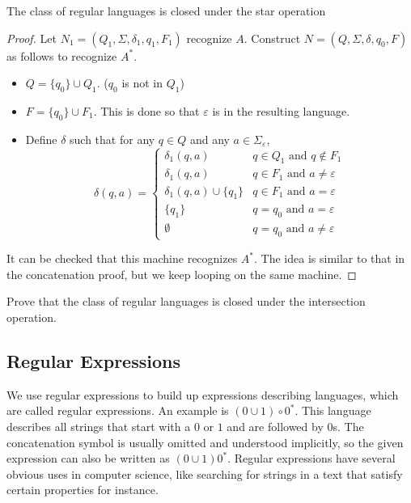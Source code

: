 \begin{theorem}
The class of regular languages is closed under the star operation
\end{theorem}
\begin{proof}
Let $N_1=(Q_1,\Sigma,\delta_1,q_1,F_1)$ recognize $A$. Construct $N=(Q,\Sigma,\delta,q_0,F)$ as follows to recognize $A^*$.
\begin{itemize}
    \item $Q=\{q_0\}\cup Q_1$. ($q_0$ is not in $Q_1$)
    \item $F=\{q_0\}\cup F_1$. This is done so that $\varepsilon$ is in the resulting language.
    \item Define $\delta$ such that for any $q\in Q$ and any $a\in\Sigma_\varepsilon$,
    $$
    \delta(q,a)=
    \begin{cases}
    \delta_1(q,a) & q\in Q_1\text{ and }q\not\in F_1 \\
    \delta_1(q,a) & q\in F_1\text{ and }a\neq\varepsilon \\
    \delta_1(q,a)\cup\{q_1\} & q\in F_1\text{ and }a=\varepsilon \\
    \{q_1\} & q=q_0\text{ and }a=\varepsilon \\
    \emptyset & q=q_0\text{ and }a\neq\varepsilon
    \end{cases}
    $$
\end{itemize}

It can be checked that this machine recognizes $A^*$. The idea is similar to that in the concatenation proof, but we keep looping on the same machine.
\end{proof}

\begin{exercise}
Prove that the class of regular languages is closed under the intersection operation.
\end{exercise}
\clearpage

\subsection{Regular Expressions}
We use regular expressions to build up expressions describing languages, which are called regular expressions. An example is $(0\cup 1)\circ 0^*$. This language describes all strings that start with a $0$ or $1$ and are followed by $0$s. The concatenation symbol is usually omitted and understood implicitly, so the given expression can also be written as $(0\cup 1)0^*$.
\vspace{3mm}
Regular expressions have several obvious uses in computer science, like searching for strings in a text that satisfy certain properties for instance.

